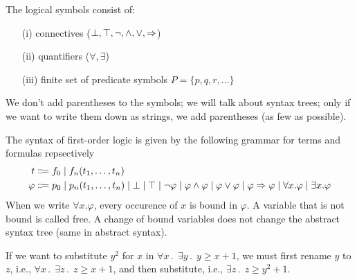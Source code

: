 \begin{definition}
The logical symbols consist of:
\begin{itemize}
\item[(i)] connectives ($\bot, \top, \neg, \land, \lor, \Rightarrow$)
\item[(ii)] quantifiers ($\forall, \exists$)
\item[(iii)] finite set of predicate symbols $P = \{ p, q, r, \dots \}$
\end{itemize}
\end{definition}

\begin{remark}
We don't add parentheses to the symbols; we will talk about syntax trees;
only if we want to write them down as strings, we add parentheses (as few as possible).
\end{remark}

\begin{definition}[Syntax]
The syntax of first-order logic is given by the following grammar for terms and formulas repsectively
\begin{align*}
    t &\Coloneqq f_0 \; | \;  f_n(t_1,\dots,t_n) \\
    \varphi &\Coloneqq p_0  \; | \; p_n(t_1,\dots,t_n)  \; | \; \bot  \; | \; \top  \; | \; \neg\varphi  \; | \;\varphi\land\varphi  \; | \; \varphi\lor\varphi  \; | \; \varphi\Rightarrow\varphi  \; | \; \forall x. \varphi  \; | \; \exists x. \varphi
\end{align*}
When we write $\forall x. \varphi$, every occurence of $x$ is bound in $\varphi$.
A variable that is not bound is called free.
A change of bound variables does not change the abstract syntax tree (same in abstract syntax).
\end{definition}


\begin{remark}
    If we want to substitute $y^2$ for $x$ in $\forall x\,.\;\, \exists y\,.\;\, y \ge x + 1$, we must first rename $y$ to $z$, i.e., $\forall x\,.\;\, \exists z\,.\;\, z \ge x + 1$, and then substitute, i.e., 
    $\exists z\,.\;\, z \ge y^2 + 1$.
\end{remark}

